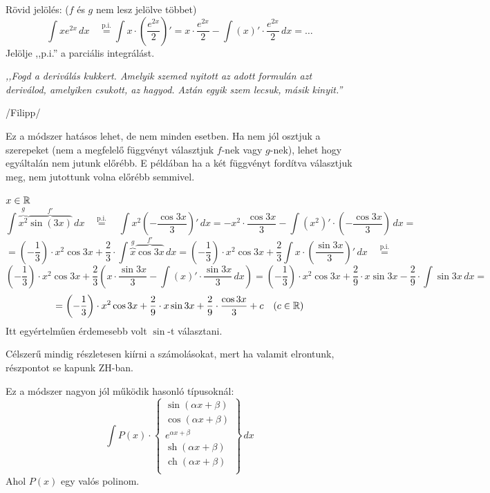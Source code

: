 \documentclass[a4paper,11.5pt]{article}
\DeclareMathOperator{\sh}{sh}
\DeclareMathOperator{\ch}{ch}
\begin{document}
	\begin{note}
		Rövid jelölés: ($f$ és $g$ nem lesz jelölve többet)
		\[ \int xe^{2x}\,dx\quad \overset{\text{p.i.}}{=}\int x\cdot\left( \frac{e^{2x}}{2}\right)'=x\cdot\frac{e^{2x}}{2}-\int(x)'\cdot\frac{e^{2x}}{2}\,dx=\ldots \]
		Jelölje ,,p.i.'' a parciális integrálást.
	\end{note}
	\begin{center}
		\textit{,,Fogd a deriválás kukkert. Amelyik szemed nyitott az adott formulán azt deriválod, amelyiken csukott, az hagyod. Aztán egyik szem lecsuk, másik kinyit.''}
		
		\smallskip
		/Filipp/
	\end{center}
	\begin{note}
		Ez a módszer hatásos lehet, de nem minden esetben. Ha nem jól osztjuk a szerepeket (nem a megfelelő függvényt választjuk $f$-nek vagy $g$-nek), lehet hogy egyáltalán nem jutunk előrébb. E példában ha a két függvényt fordítva választjuk meg, nem jutottunk volna előrébb semmivel.
	\end{note}
	\begin{task}$x\in\mathbb{R}$
		\[ \int \overbrace{x^2}^{g}\overbrace{\sin(3x)}^{f'}\,dx \quad \overset{\text{p.i.}}{=}\quad  \int x^2\left(-\frac{\cos3x}{3}\right)'\,dx=-x^2\cdot\frac{\cos3x}{3}-\int\left(x^2\right)'\cdot\left(-\frac{\cos3x}{3}\right)\,dx=\]
		\[=\left(-\frac{1}{3}\right)\cdot x^2\cos3x+\frac{2}{3}\cdot\int \overbrace{x}^{g}\overbrace{\cos3x}^{f'}\,dx=\left(-\frac{1}{3}\right)\cdot x^2\cos3x+\frac{2}{3}\int x\cdot\left( \frac{\sin3x}{3}\right)'\,dx\quad \overset{\text{p.i.}}{=} \]
		\[  \left(-\frac{1}{3}\right)\cdot x^2\cos3x+\frac{2}{3}\left(x\cdot\frac{\sin3x}{3}-\int(x)'\cdot\frac{\sin3x}{3}\,dx\right)=\left(-\frac{1}{3}\right)\cdot x^2\cos3x+\frac{2}{9}\cdot x\sin3x-\frac{2}{9}\cdot\int\sin3x\,dx=\]
		\[=\left(-\frac{1}{3}\right) \cdot x^2\cos3x+\frac{2}{9}\cdot
		x\sin3x+\frac{2}{9}\cdot\frac{\cos3x}{3} + c\quad (c\in\mathbb{R}) \]
		Itt egyértelműen érdemesebb volt $\sin$-t választani.
	\end{task}
	\begin{note}
		Célszerű mindig részletesen kiírni a számolásokat, mert ha valamit elrontunk, részpontot se kapunk ZH-ban.
	\end{note}
	\begin{note}
		Ez a módszer nagyon jól működik hasonló típusoknál:
		\[ \int P(x)\cdot
		\left.\begin{cases}
			\sin(\alpha x+\beta)\\
			\cos(\alpha x+\beta)\\
			e^{\alpha x+\beta}\\
			\sh(\alpha x+\beta)\\
			\ch(\alpha x+\beta)\\
		\end{cases}\right\}\,dx \]
		Ahol $P(x)$ egy valós polinom.
	\end{note}
\end{document}
